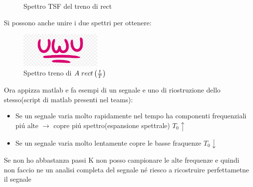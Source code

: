                 \begin{figure}[H]
                    \centering
                    \hfill
                    \caption{Spettro TSF del treno di rect}
                \end{figure}
                Si possono anche unire i due spettri per ottenere: 
                \begin{figure}[H]
                    \centering
                    \includegraphics[width=4cm]{media/uwu.png}
                    \caption{Spettro treno di $A\hspace{0.1cm}rect\left(\frac{t}{T}\right)$}
                    \label{fig:Spettro treno di rect}
                \end{figure}  
            Ora appizza matlab e fa esempi di un segnale e uno di riostruzione dello stesso(script di matlab presenti nel teams):
            \begin{itemize}
                \item Se un segnale varia molto rapidamente nel tempo ha componenti frequenziali piú alte $\rightarrow$ copre piú spettro(espansione spettrale) $T_0 \uparrow$
                \item Se un segnale varia molto lentamente copre le basse fraquenze $ T_0 \downarrow$
            \end{itemize}
            Se non ho abbastanza passi K non posso campionare le alte frequenze e quindi non faccio ne un analisi completa del segnale né riesco a ricostruire perfettametne il segnale  












